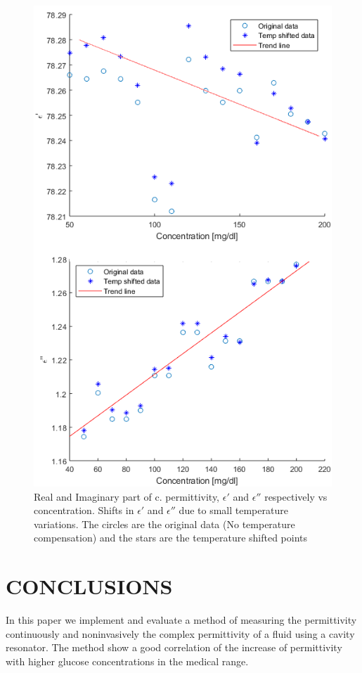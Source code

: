 \documentclass[10pt,final,conference,a4paper,twocolumn]{IEEEtran_AntennEMB_GigaHertz2016}
\begin{document}
\begin{figure}[t]
	\centering
	\includegraphics[width=0.78\columnwidth]{pumpgluzoomERE.png}
	\caption{Real and Imaginary part of c. permittivity, $\epsilon'$ and $\epsilon''$ respectively vs concentration. Shifts in $\epsilon'$ and $\epsilon''$ due to small temperature variations. The circles are the original data (No temperature compensation) and the stars are the temperature shifted points}
	\label{fig:eim}
\end{figure}







\section{CONCLUSIONS}
In this paper we implement and evaluate a method of measuring the permittivity continuously and noninvasively the complex permittivity of a fluid using a cavity resonator. The method show a good correlation of the increase of permittivity with higher glucose concentrations in the medical range.
\end{document}
